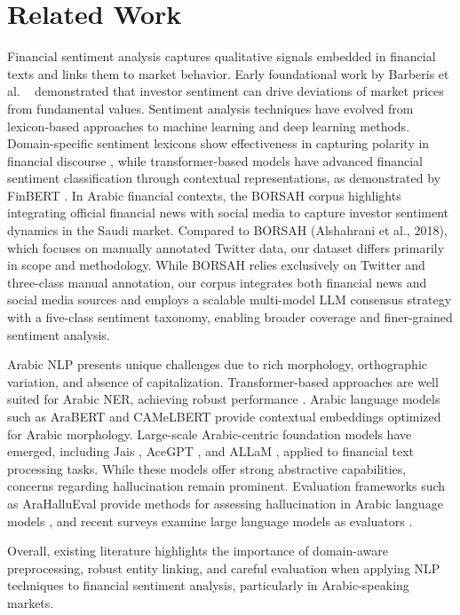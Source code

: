 \documentclass[10pt,a4paper]{article}
\begin{document}
\section{Related Work}

Financial sentiment analysis captures qualitative signals embedded in financial texts and links them to market behavior. Early foundational work by Barberis et al. ~\citep{Barberis1997} demonstrated that investor sentiment can drive deviations of market prices from fundamental values. Sentiment analysis techniques have evolved from lexicon-based approaches to machine learning and deep learning methods. Domain-specific sentiment lexicons show effectiveness in capturing polarity in financial discourse \citep{Sohangir2018}, while transformer-based models have advanced financial sentiment classification through contextual representations, as demonstrated by FinBERT \citep{Araci2019}. In Arabic financial contexts, the BORSAH corpus \citep{Alshahrani2018} highlights integrating official financial news with social media to capture investor sentiment dynamics in the Saudi market. Compared to BORSAH (Alshahrani et al., 2018), which focuses on manually annotated Twitter data, our dataset differs primarily in scope and methodology. While BORSAH relies exclusively on Twitter and three-class manual annotation, our corpus integrates both financial news and social media sources and employs a scalable multi-model LLM consensus strategy with a five-class sentiment taxonomy, enabling broader coverage and finer-grained sentiment analysis.

Arabic NLP presents unique challenges due to rich morphology, orthographic variation, and absence of capitalization. Transformer-based approaches are well suited for Arabic NER, achieving robust performance \citep{ElBazi2019}. Arabic language models such as AraBERT \citep{Antoun2020} and CAMeLBERT \citep{Inoue2021} provide contextual embeddings optimized for Arabic morphology. Large-scale Arabic-centric foundation models have emerged, including Jais \citep{Sengupta2023}, AceGPT \citep{Huang2024}, and ALLaM \citep{Abdelali2024}, applied to financial text processing tasks. While these models offer strong abstractive capabilities, concerns regarding hallucination remain prominent. Evaluation frameworks such as AraHalluEval provide methods for assessing hallucination in Arabic language models \citep{Alansari2025}, and recent surveys examine large language models as evaluators \citep{Du2024, Gu2024}.

Overall, existing literature highlights the importance of domain-aware preprocessing, robust entity linking, and careful evaluation when applying NLP techniques to financial sentiment analysis, particularly in Arabic-speaking markets.
\end{document}
